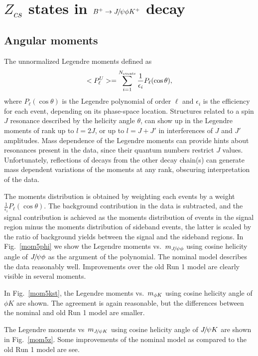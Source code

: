 \chapter{$Z_{cs}$ states in ${{{B}^+}}\rightarrow{\ensuremath{{J\mskip -3mu/\mskip -2mu\psi}}}\phi{\ensuremath{{K}^+}}$ decay}
\label{app:Zcs_appendix}


\section{Angular moments}
\label{sec:app:Y}

The unnormalized Legendre moments defined as
\begin{equation}
<P^U_{\ell}>=\sum_{i=1}^{N_{\rm events}}\frac{1}{\epsilon_i}P_{\ell}(\cos\theta),
\end{equation}
where $P_{\ell}(\cos\theta)$ is the Legendre polynomial of order $\ell$ and $\epsilon_i$ is the efficiency for each event, 
depending on its phase-space location.
Structures related to a spin $J$ resonance described by the helicity angle $\theta$, 
can show up in the Legendre moments of rank up to $l=2J$, 
or up to $l=J+J'$ in interferences of $J$ and $J'$ amplitudes.  
Mass dependence of the Legendre moments can provide hints about resonances present in the data, 
since their quantum numbers restrict $J$ values. 
Unfortunately, 
reflections of decays from the other decay chain(s) can generate mass dependent variations of the moments at any rank, 
obscuring interpretation of the data.

The moments distribution is obtained by weighting each events by a weight $\frac{1}{\epsilon_i}P_{\ell}(\cos\theta)$. 
The background contribution in the data is subtracted, 
and the signal contribution is achieved as the moments distribution of events in the signal region minus the moments distribution of sideband events, 
the latter is scaled by the ratio of background yields between the signal and the sideband regions.
In Fig.~\ref{mom5phi}  we show the Legendre moments vs.~$m_{{{J\mskip -3mu/\mskip -2mu\psi}} \phi}$ using cosine helicity angle of ${{J\mskip -3mu/\mskip -2mu\psi}}\phi$ as the argument of the polynomial.
The nominal model describes the data reasonably well.
Improvements over the old Run 1 model are clearly visible in several moments.

In Fig.~\ref{mom5kst}, the Legendre moments vs.~$m_{\phi K}$
using cosine helicity angle of $\phi K$ are shown. 
The agreement is again reasonable, 
but the differences between the nominal and old Run 1 model are smaller.

The Legendre moments vs~$m_{{{J\mskip -3mu/\mskip -2mu\psi}} K}$ using cosine helicity angle of ${{J\mskip -3mu/\mskip -2mu\psi}} K$  are shown in Fig.~\ref{mom5z}. 
Some improvements of the nominal model as compared to the old Run 1 model are see.




